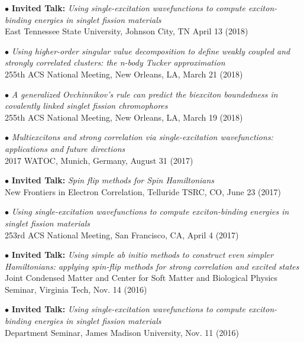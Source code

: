 \documentclass[10pt]{article}
\newenvironment{lonelist}[1][\enskip\textbullet]%
        {\vspace{-\baselineskip}\begin{list}{#1}{%
        \setlength{\partopsep}{0pt}%
        \setlength{\topsep}{0pt}}}
        {\end{list}\vspace{-.6\baselineskip}}
\begin{document}
\begin{lonelist}
\item[$\bullet$] \textbf{Invited Talk:} \textit{Using single-excitation wavefunctions to compute exciton-binding energies in singlet fission materials}\\
East Tennessee State University, Johnson City, TN  April 13 (2018)

\item[$\bullet$] \textit{Using higher-order singular value decomposition to define weakly coupled and strongly correlated clusters: the n-body Tucker approximation}\\
255th ACS National Meeting,  New Orleans, LA, March 21 (2018)

\item[$\bullet$] \textit{A generalized Ovchinnikov's rule can predict the biexciton boundedness in covalently linked singlet fission chromophores}\\
255th ACS National Meeting,  New Orleans, LA, March 19 (2018)

\item[$\bullet$] \textit{Multiexcitons and strong correlation via single-excitation wavefunctions: applications and future directions}\\
2017 WATOC, Munich, Germany,  August 31 (2017)

\item[$\bullet$] \textbf{Invited Talk:} \textit{Spin flip methods for Spin Hamiltonians}\\
New Frontiers in Electron Correlation, Telluride TSRC, CO,  June 23 (2017)

\item[$\bullet$] \textit{Using single-excitation wavefunctions to compute exciton-binding energies in singlet fission materials}\\
253rd ACS National Meeting, San Francisco, CA, April 4 (2017)

\item[$\bullet$] \textbf{Invited Talk:} \textit{Using simple ab initio methods to construct even simpler Hamiltonians: applying spin-flip methods for strong correlation and excited states}\\
Joint Condensed Matter and Center for Soft Matter and Biological Physics Seminar, Virginia Tech, Nov. 14 (2016)

\item[$\bullet$] \textbf{Invited Talk:} \textit{Using single-excitation wavefunctions to compute exciton-binding energies in singlet fission materials}\\
Department Seminar, James Madison University, Nov. 11 (2016)


\end{lonelist}
\end{document}
